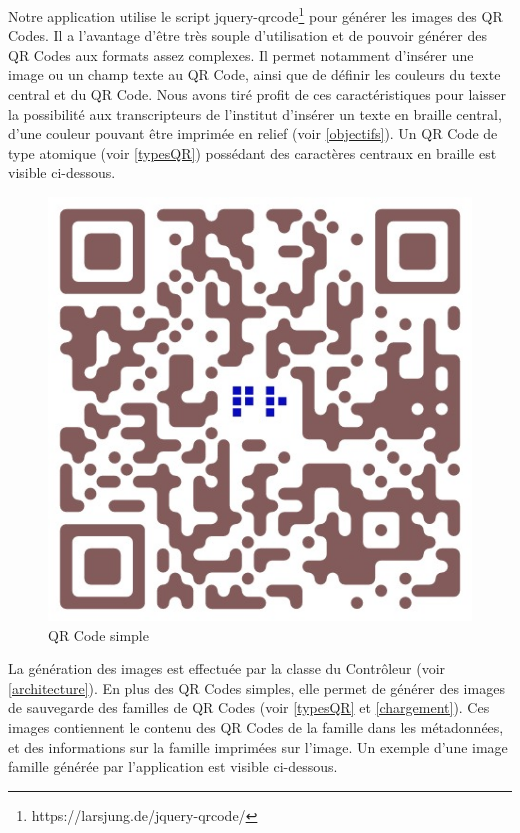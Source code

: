 \par
Notre application utilise le script jquery-qrcode\footnote{https://larsjung.de/jquery-qrcode/} pour générer les images des QR Codes. Il a l'avantage d'être très souple d'utilisation et de pouvoir générer des QR Codes aux formats assez complexes. Il permet notamment d'insérer une image ou un champ texte au QR Code, ainsi que de définir les couleurs du texte central et du QR Code. Nous avons tiré profit de ces caractéristiques pour laisser la possibilité aux transcripteurs de l'institut d'insérer un texte en braille central, d'une couleur pouvant être imprimée en relief (voir \ref{objectifs}). Un QR Code de type atomique (voir \ref{typesQR}) possédant des caractères centraux en braille est visible ci-dessous.\\

\begin{figure}[h!]
	\centering
   \includegraphics[scale=0.25]{img/qrsimple.jpeg}
   \caption{QR Code simple}
\end{figure}

\par
La génération des images est effectuée par la classe du Contrôleur  (voir \ref{architecture}). En plus des QR Codes simples, elle permet de générer des images de sauvegarde des familles de QR Codes (voir \ref{typesQR} et \ref{chargement}). Ces images contiennent le contenu des QR Codes de la famille dans les métadonnées, et des informations sur la famille imprimées sur l'image. Un exemple d'une image famille générée par l'application est visible ci-dessous.

